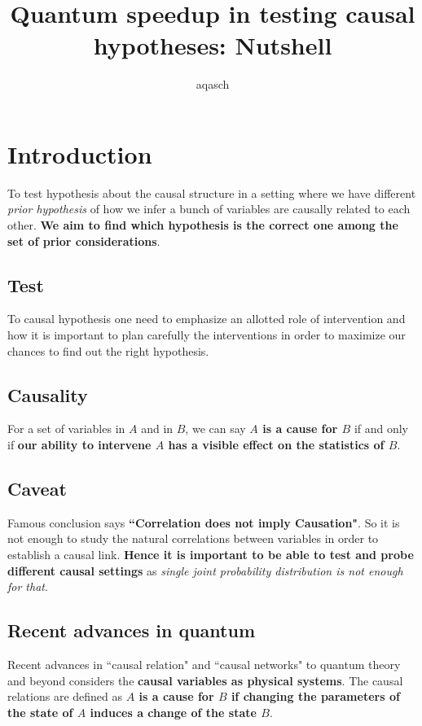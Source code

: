 \documentclass[a4paper,11pt]{article}
\begin{document}
\title{Quantum speedup in testing causal hypotheses: Nutshell}
\author{aqasch}
\date{}
\maketitle
\section{Introduction}
To test hypothesis about the causal structure in a setting where we have different \textit{prior hypothesis} of how we infer a bunch of variables are causally related to each other. \textbf{We aim to find which hypothesis is the correct one among the set of prior considerations}.

\subsection{Test} To causal hypothesis one need to emphasize an allotted role of intervention and how it is important to plan carefully the interventions in order to maximize our chances to find out the right hypothesis.

\subsection{Causality} For a set of variables in $A$ and in $B$, we can say \textbf{$A$ is a cause for $B$} if and only if \textbf{our ability to intervene $A$ has a visible effect on the statistics of $B$}.

\subsection{Caveat} Famous conclusion says \textbf{``Correlation does not imply Causation"}. So it is not enough to study the natural correlations between variables in order to establish a causal link. \textbf{Hence it is important to be able to test and probe different causal settings} as \textit{single joint probability distribution is not enough for that}.

\subsection{Recent advances in quantum}
Recent advances in ``causal relation" and ``causal networks" to quantum theory and beyond considers the \textbf{causal variables as physical systems}. The causal relations are defined as \textbf{$A$ is a cause for $B$ if changing the parameters of the state of $A$ induces a change of the state $B$}.
\end{document}
